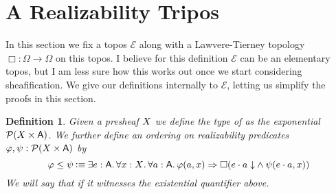 \documentclass[11pt]{article}
\newtheorem{defn}[thrm]{Definition}
\begin{document}
%

\section{A Realizability Tripos}

In this section we fix a topos \(\mathcal{E}\) along with a Lawvere-Tierney
topology \(\Box : \Omega \to \Omega\) on this topos.
%
I believe for this definition \(\mathcal{E}\) can be an elementary topos,
but I am less sure how this works out once we start considering sheafification.
%
We give our definitions internally to \(\mathcal{E}\), letting us simplify
the proofs in this section.


\begin{defn}\label{defn:tripos-predicates-and-ordering}
  Given a presheaf \(X\) we define the type of  as the exponential \(\mathcal{P}{({X}\times{\ensuremath{\mathsf{A}}})} \).
  We further define an ordering on realizability
  predicates~\(\varphi, \psi : \mathcal{P}{({X}\times{\ensuremath{\mathsf{A}}})}\) by
  \[
    \varphi \leq \psi
    \IsDefined
    \IExists{e : \A}{
      \IForall{x : \X}{
        \IForall{a : \A}{
          \IImplies%
            {\varphi(a,x)}%
            {\IBox{(
              \IAnd%
              {\ITotal{\IAp{e}{a}}}%
              {\psi(\IAp{e}{a}, x)}
            )}}
        }
      }
    }
  \]
  We will say that  if
  it witnesses the existential quantifier above.
\end{defn}
\end{document}
